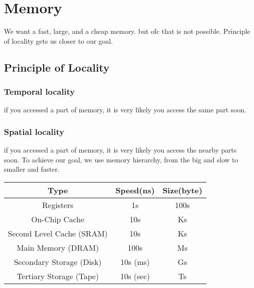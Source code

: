 \chapter{Memory}
We want a fast, large, and a cheap memory. but ofc that is not possible.
Principle of locality gets us closer to our goal.
\section{Principle of Locality}
\subsection{Temporal locality}
if you accessed a part of memory, it is very likely you access the same part soon.
\subsection{Spatial locality}
if you accessed a part of memory, it is very likely you access the nearby parts soon.
To achieve our goal, we use memory hierarchy, from the big and slow to smaller and faster.
\begin{center}
    \begin{tabular}{c|c|c}
        Type                      & Speed(ns) & Size(byte) \\ \hline
        Registers                 & 1s        & 100s       \\\hline
        On-Chip Cache             & 10s       & Ks         \\\hline
        Second Level Cache (SRAM) & 10s       & Ks         \\\hline
        Main Memory (DRAM)        & 100s      & Ms         \\\hline
        Secondary Storage (Disk)  & 10s (ms)  & Gs         \\\hline
        Tertiary Storage (Tape)   & 10s (sec) & Ts
    \end{tabular}
\end{center}

